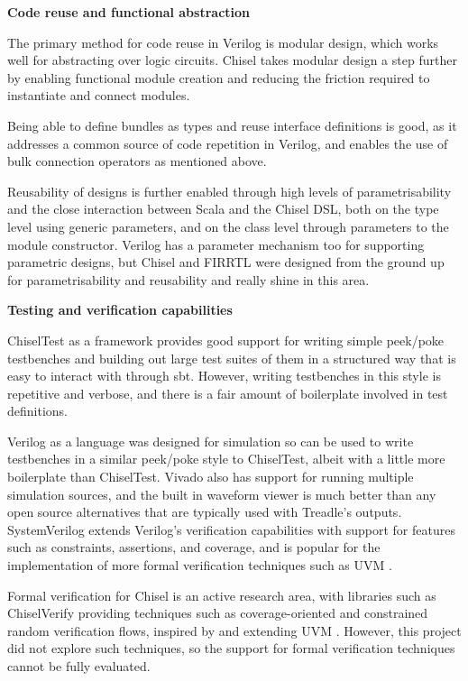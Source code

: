 \textbf{Code reuse and functional abstraction}

The primary method for code reuse in Verilog is modular design, which works well for abstracting over logic circuits. Chisel takes modular design a step further by enabling functional module creation and reducing the friction required to instantiate and connect modules.

Being able to define bundles as types and reuse interface definitions is good, as it addresses a common source of code repetition in Verilog, and enables the use of bulk connection operators as mentioned above.

Reusability of designs is further enabled through high levels of parametrisability and the close interaction between Scala and the Chisel DSL, both on the type level using generic parameters, and on the class level through parameters to the module constructor. Verilog has a parameter mechanism too for supporting parametric designs, but Chisel and FIRRTL were designed from the ground up for parametrisability and reusability \cite{chisel, firrtl} and really shine in this area.

\textbf{Testing and verification capabilities}

ChiselTest as a framework provides good support for writing simple peek/poke testbenches and building out large test suites of them in a structured way that is easy to interact with through sbt. However, writing testbenches in this style is repetitive and verbose, and there is a fair amount of boilerplate involved in test definitions.

Verilog as a language was designed for simulation so can be used to write testbenches in a similar peek/poke style to ChiselTest, albeit with a little more boilerplate than ChiselTest. Vivado also has support for running multiple simulation sources, and the built in waveform viewer is much better than any open source alternatives that are typically used with Treadle's outputs. SystemVerilog extends Verilog's verification capabilities with support for features such as constraints, assertions, and coverage, and is popular for the implementation of more formal verification techniques such as UVM \cite{spear_tumbush_2012,uvm}.

Formal verification for Chisel is an active research area, with libraries such as ChiselVerify providing techniques such as coverage-oriented and constrained random verification flows, inspired by and extending UVM \cite{chiselverify}. However, this project did not explore such techniques, so the support for formal verification techniques cannot be fully evaluated.

